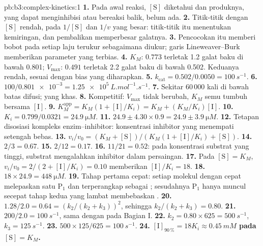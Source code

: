 \begin{solution}{pb:b3:complex-kinetics:1}
\textbf{1.} Pada awal reaksi, $[\mathrm S]$ diketahui dan produknya, yang dapat
menginhibisi atau bereaksi balik, belum ada.
\textbf{2.} Titik-titik dengan $[\mathrm S]$ rendah, pada $1/[\mathrm S]$ dan $1/v$ yang
besar: titik-titik itu menentukan kemiringan, dan pembalikan memperbesar
galatnya.
\textbf{3.} Pencocokan itu memberi bobot pada setiap laju terukur sebagaimana
diukur; garis Lineweaver--Burk memberikan parameter yang terbias.
\textbf{4.} $K_M$: $0.773$ terletak 1.2 galat baku di bawah 0.801; $V_{\max}$: $0.491$
terletak 2.2 galat baku di bawah 0.502. Keduanya rendah, sesuai dengan bias
yang diharapkan.
\textbf{5.} $k_{\mathrm{cat}} = 0.502/0.0050 = \qty{100}{s^{-1}}$.
\textbf{6.} $100/\num{0.801e-3} = \qty{1.25e5}{L.mol^{-1}.s^{-1}}$.
\textbf{7.} Sekitar 60\,000 kali di bawah batas difusi;  yang khas.
\textbf{8.} Kompetitif: $V_{\max}$ tidak berubah, $K_M$ semu tumbuh bersama $[\mathrm I]$.
\textbf{9.} $K_M^{\mathrm{app}} = K_M(1 + [\mathrm I]/K_i) = K_M + (K_M/K_i)[\mathrm I]$.
\textbf{10.} $K_i = 0.799/0.0321 = \qty{24.9}{\micro M}$.
\textbf{11.} $24.9 \pm 4.30 \times 0.9 = 24.9 \pm \qty{3.9}{\micro M}$.
\textbf{12.} Tetapan disosiasi kompleks enzim--inhibitor: konsentrasi inhibitor
yang menempati setengah  bebas.
\textbf{13.} $v_i/v_0 = (K_M + [\mathrm S])/(K_M(1 + [\mathrm I]/K_i) + [\mathrm S])$.
\textbf{14.} $2/3 = 0.67$.
\textbf{15.} $2/12 = 0.17$.
\textbf{16.} $11/21 = 0.52$: pada konsentrasi substrat yang tinggi, substrat
mengalahkan inhibitor dalam persaingan.
\textbf{17.} Pada $[\mathrm S] = K_M$, $v_i/v_0 = 2/(2 + [\mathrm I]/K_i) = 0.10$ memberikan
$[\mathrm I]/K_i = 18$.
\textbf{18.} $18 \times 24.9 = \qty{448}{\micro M}$.
\textbf{19.} Tahap pertama cepat: setiap molekul  dengan cepat melepaskan
satu $\mathrm P_1$ dan terperangkap sebagai ; sesudahnya $\mathrm P_1$
hanya muncul secepat tahap kedua yang lambat membebaskan .
\textbf{20.} $1.28/2.0 = 0.64 = (k_2/(k_2 + k_3))^2$, sehingga $k_2/(k_2 + k_3) = 0.80$.
\textbf{21.} $200/2.0 = \qty{100}{s^{-1}}$, sama dengan pada Bagian I.
\textbf{22.} $k_2 = 0.80 \times 625 = \qty{500}{s^{-1}}$, $k_3 = \qty{125}{s^{-1}}$.
\textbf{23.} $500 \times 125/625 = \qty{100}{s^{-1}}$.
\textbf{24.} \textbf{$[\mathrm I]_{90\,\%} = 18K_i \approx \qty{0.45}{mM}$ pada $[\mathrm S] = K_M$.}
\end{solution}
